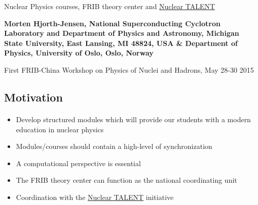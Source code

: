 \documentclass[%
twoside,                 %
final,                   %
10pt]{article}
\begin{document}






\thispagestyle{empty}

\begin{center}
{\LARGE\bf
\begin{spacing}{1.25}
Nuclear Physics courses, FRIB theory center and \href{{http://www.nucleartalent.org}}{Nuclear TALENT}
\end{spacing}
}
\end{center}


\begin{center}
{\bf Morten Hjorth-Jensen, National Superconducting Cyclotron Laboratory and Department of Physics and Astronomy, Michigan State University, East Lansing, MI 48824, USA {\&} Department of Physics, University of Oslo, Oslo, Norway${}^{}$} \\ [0mm]
\end{center}

    \begin{center}
\end{center}
    

\begin{center} %
First FRIB-China Workshop on Physics of Nuclei and Hadrons, May 28-30 2015
\end{center}

\vspace{1cm}


\subsection{Motivation}

\paragraph{}
\begin{itemize}
\item Develop structured modules which will provide our students with a modern education in nuclear physics

\item Modules/courses should contain a high-level of synchronization

\item A computational perspective is essential

\item The FRIB theory center can function as the national coordinating unit

\item Coordination with the \href{{http://www.nucleartalent.org}}{Nuclear TALENT} initiative
\end{itemize}
\end{document}
